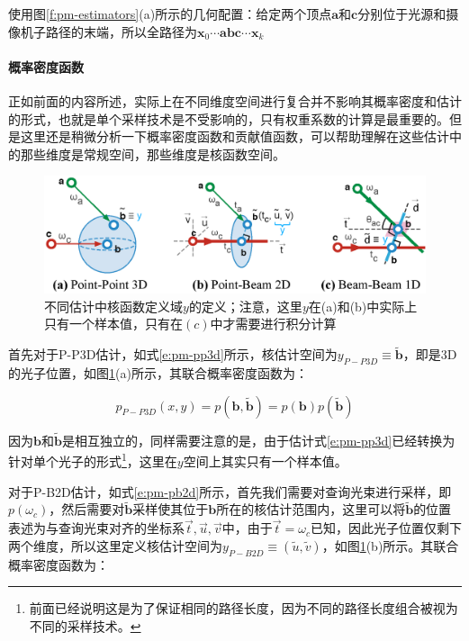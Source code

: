 使用图\ref{f:pm-estimators}(a)所示的几何配置：给定两个顶点$\mathbf{a}$和$\mathbf{c}$分别位于光源和摄像机子路径的末端，所以全路径为$\mathbf{x}_0\cdots\mathbf{a}\mathbf{b}\mathbf{c}\cdots\mathbf{x}_k$




\paragraph{概率密度函数}
正如前面的内容所述，实际上在不同维度空间进行复合并不影响其概率密度和估计的形式，也就是单个采样技术是不受影响的，只有权重系数的计算是最重要的。但是这里还是稍微分析一下概率密度函数和贡献值函数，可以帮助理解在这些估计中的那些维度是常规空间，那些维度是核函数空间。

\begin{figure}
	\includegraphics[width=1.\textwidth]{figures/pm/y}
	\caption{不同估计中核函数定义域$y$的定义；注意，这里$y$在(a)和(b)中实际上只有一个样本值，只有在$(c)$中才需要进行积分计算}
	\label{f:pm-y}
\end{figure}

首先对于P-P3D估计，如式\ref{e:pm-pp3d}所示，核估计空间为$y_{P-P3D}\equiv \tilde{\mathbf{b}}$，即是3D的光子位置，如图\ref{f:pm-y}(a)所示，其联合概率密度函数为：

\begin{equation}
	p_{P-P3D}(x,y)=p(\mathbf{b},\tilde{\mathbf{b}})=p(\mathbf{b})p(\tilde{\mathbf{b}})
\end{equation}

因为$\mathbf{b}$和$\tilde{\mathbf{b}}$是相互独立的，同样需要注意的是，由于估计式\ref{e:pm-pp3d}已经转换为针对单个光子的形式\footnote{前面已经说明这是为了保证相同的路径长度，因为不同的路径长度组合被视为不同的采样技术。}，这里在$y$空间上其实只有一个样本值。

对于P-B2D估计，如式\ref{e:pm-pb2d}所示，首先我们需要对查询光束进行采样，即$p(\omega_c)$，然后需要对$\tilde{\mathbf{b}}$采样使其位于$\mathbf{b}$所在的核估计范围内，这里可以将$\tilde{\mathbf{b}}$的位置表述为与查询光束对齐的坐标系$\vec{t},\vec{u},\vec{v}$中，由于$\vec{t}=\omega_c$已知，因此光子位置仅剩下两个维度，所以这里定义核估计空间为$y_{P-B2D}\equiv (\tilde{u},\tilde{v})$，如图\ref{f:pm-y}(b)所示。其联合概率密度函数为：

